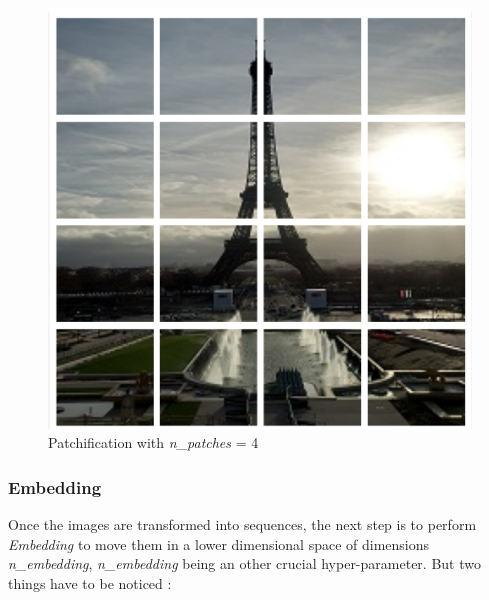 \documentclass[twocolumn,superscriptaddress,aps]{revtex4-1}
\begin{document}
\begin{figure}[hbtp]
    \centering
    \includegraphics[width = 0.25 \textwidth]{images/patchify.png}
    \caption{Patchification with \textit{n\_patches} = 4}
    \label{fig:patchify}
\end{figure}

\subsubsection{Embedding}

Once the images are transformed into sequences, the next step is to perform \textit{Embedding} to move them in a lower dimensional space of dimensions \textit{n\_embedding}, \textit{n\_embedding} being an other crucial hyper-parameter. But two things have to be noticed : 
\end{document}
